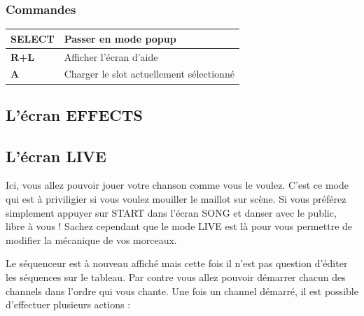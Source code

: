 \documentclass[12pt,a4paper]{article}
\begin{document}
    \subsubsection{Commandes}
    \tablelasttail{\hline}
    \begin{supertabular}{|l|p{11cm}|}
    \hline
        {\bf SELECT} & Passer en mode popup \\
        \hline
        {\bf R+L} & Afficher l'écran d'aide \\
        \hline
        {\bf A} & Charger le slot actuellement sélectionné \\
    \hline
    \end{supertabular}


    \subsection{L'écran EFFECTS}
    
    
    \subsection{L'écran LIVE}

    Ici, vous allez pouvoir jouer votre chanson comme vous le voulez.
    C'est ce mode qui est à priviligier si vous voulez mouiller le maillot sur scène.
    Si vous préférez simplement appuyer sur START dans l'écran SONG et danser avec le public, libre à vous !
    Sachez cependant que le mode LIVE est là pour vous permettre de modifier la mécanique de vos morceaux.


    Le séquenceur est à nouveau affiché mais cette fois il n'est pas question d'éditer les séquences sur le tableau.
    Par contre vous allez pouvoir démarrer chacun des channels dans l'ordre qui vous chante.
    Une fois un channel démarré, il est possible d'effectuer plusieurs actions :
    \medskip
\end{document}

